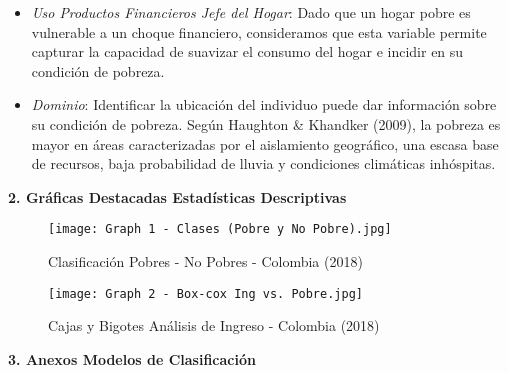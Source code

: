 \documentclass[11pt]{article}
\begin{document}
\begin{itemize}
\item \emph{Uso Productos Financieros Jefe del Hogar}: Dado que un hogar pobre es vulnerable a un choque financiero, consideramos que esta variable permite capturar  la capacidad de suavizar el consumo del hogar e incidir en su condición de pobreza.  
\item \emph{Dominio}: Identificar la ubicación del individuo puede dar información sobre su condición de pobreza. Según Haughton & Khandker (2009), la pobreza es mayor en áreas caracterizadas por el aislamiento geográfico, una escasa base de recursos, baja probabilidad de lluvia y condiciones climáticas inhóspitas.
\end{itemize}

\textbf{2. Gráficas Destacadas Estadísticas Descriptivas}

\clearpage
\begin{figure}[h]
\caption{Clasificación Pobres - No Pobres - Colombia (2018)}
\centering
\texttt{[image: Graph 1 - Clases (Pobre y No Pobre).jpg]}
\end{figure}

\begin{figure}[h]
\caption{Cajas y Bigotes Análisis de Ingreso - Colombia (2018)}
\centering
\texttt{[image: Graph 2 - Box-cox Ing vs. Pobre.jpg]}
\end{figure}

\clearpage
\textbf{3. Anexos Modelos de Clasificación}
\end{document}
